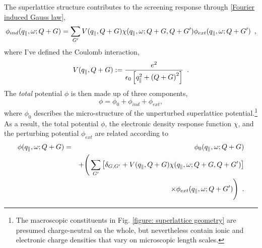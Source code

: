 The superlattice structure contributes to the screening response through \eqref{Fourier induced Gauss law},
\begin{equation}
     \phi_{ind}(q_{\parallel},\omega;Q+G) = \sum_{G'}V(q_{\parallel},Q+G)\chi(q_{\parallel},\omega;Q+G, Q+G')
     \phi_{ext}(q_{\parallel},\omega;Q+G')
     \,\,\,,
\end{equation}
where I've defined the Coulomb interaction,
\begin{equation}
    V(q_{\parallel},Q+G):=
    \frac{e^2}{\epsilon_0\left[ q_{\parallel}^2+\left( Q+G\right)^2\right]}
    \,\,\,.
\end{equation}
The {\it total} potential $\phi$ is then made up of three components,
\begin{equation}
    \phi = \phi_0 + \phi_{ind} + \phi_{ext},
\end{equation}
where $\phi_0$ describes the micro-structure of the unperturbed superlattice potential.\footnote{The macroscopic constituents in Fig. \ref{figure: superlattice geometry} are presumed charge-neutral on the whole, but nevertheless contain ionic and electronic charge densities that vary on microscopic length scales.}  As a result, the total potential $\phi$, the electronic density response function $\chi$, and the perturbing potential $\phi_{ext}$ are related according to
\begin{eqnarray}
    \label{microscopic total potential expression}
    \nonumber 
    \phi(q_{\parallel},\omega;Q+G) 
    &=&
    \phi_0(q_{\parallel}, \omega; Q+G) 
    \\ \nonumber &\,& +
    \Bigg(\sum_{G'}
    \left[
    \delta_{G,G'}
    +
    V(q_{\parallel},Q+G)
    \chi(q_{\parallel},\omega;Q+G, Q+G')
    \right]
    \\ &\,&
    \times
    \phi_{ext}(q_{\parallel},\omega;Q+ G')\Bigg)
    \,\,\,.
\end{eqnarray}

